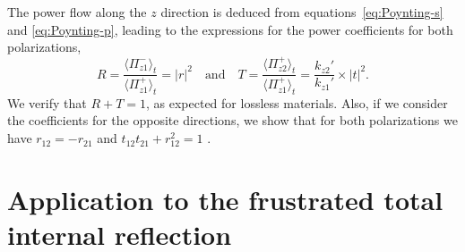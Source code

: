 The power flow along the $z$ direction is deduced from equations~\ref{eq:Poynting-s} and \ref{eq:Poynting-p}, leading to the expressions for the power coefficients for both polarizations,
$$
R = \frac{\langle \Pi_{z1}^- \rangle_t}{\langle \Pi_{z1}^+ \rangle_t}
= |r|^2
\quad\textrm{and}\quad
T = \frac{\langle \Pi_{z2}^+ \rangle_t}{\langle \Pi_{z1}^+ \rangle_t} 
= \frac{k_{z2}'}{k_{z1}'} \times |t|^2.
$$
We verify that $R+T=1$, as expected for lossless materials.
%
Also, if we consider the coefficients for the opposite directions, we show that for both polarizations we have
$r_{12} = - r_{21}$
and
$t_{12} t_{21} + r_{12}^2 = 1$
.


\section{Application to the frustrated total internal reflection}

